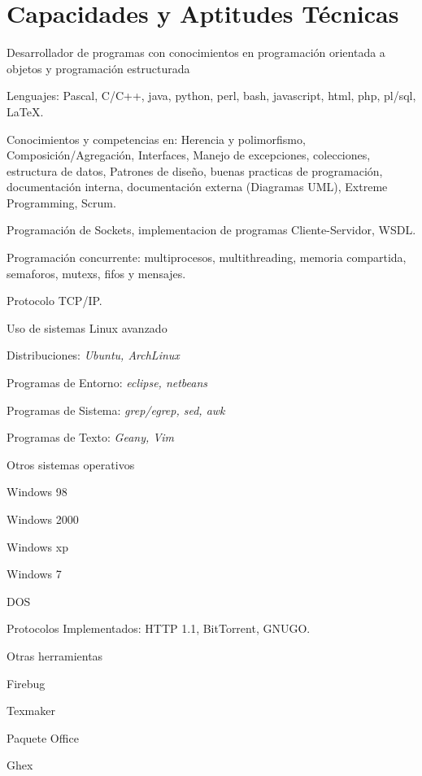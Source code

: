 \documentclass[11pt,a4paper,sans]{moderncv} %
\newenvironment{innerlist}[1][\enskip\textbullet]%
        {\begin{compactitem}[#1]}{\end{compactitem}}
\begin{document}
\section{Capacidades y Aptitudes Técnicas}
	\begin{innerlist}
        \item Desarrollador de programas con conocimientos en programación orientada a objetos y programación estructurada
        \item Lenguajes: Pascal, C/C++, java, python, perl, bash, javascript, html, php, pl/sql, \LaTeX.
        \item Conocimientos y competencias en: 
			  Herencia y polimorfismo, Composición/Agregación, Interfaces, Manejo de excepciones, colecciones, estructura de datos, Patrones de diseño, buenas practicas de programación, 		   			  documentación interna, documentación externa (Diagramas UML), Extreme Programming, Scrum.
        \item Programación de Sockets, implementacion de programas Cliente-Servidor, WSDL.
        \item Programación concurrente: multiprocesos, multithreading, memoria compartida, semaforos, mutexs, fifos y mensajes.
        \item Protocolo TCP/IP.
        \item Uso de sistemas Linux avanzado
        	\begin{innerlist}
		        \item Distribuciones: \emph{Ubuntu, ArchLinux}
		        \item Programas de Entorno: \emph{eclipse, netbeans}
		        \item Programas de Sistema: \emph{grep/egrep, sed, awk}
    		    \item Programas de Texto: \emph{Geany, Vim}
	        \end{innerlist}	
	    \item Otros sistemas operativos    
	    \begin{innerlist}
		        \item Windows 98
		        \item Windows 2000
		        \item Windows xp
    		    \item Windows 7
    		    \item DOS
	   \end{innerlist}	
       \item Protocolos Implementados: HTTP 1.1, BitTorrent, GNUGO.
       \item Otras herramientas
       \begin{innerlist}
		        \item Firebug
		        \item Texmaker
		        \item Paquete Office
    		    \item Ghex
	   \end{innerlist}	
    \end{innerlist}  




\end{document}
